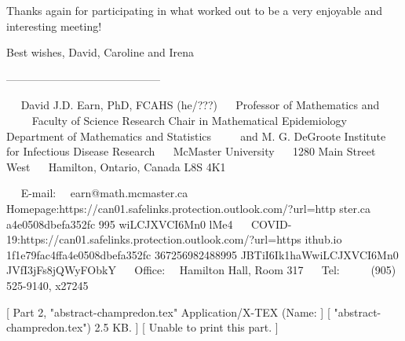 Thanks again for participating in what worked out to be a very enjoyable
and interesting meeting!

Best wishes,
David, Caroline and Irena

------------------------------------------

   David J.D. Earn, PhD, FCAHS (he/???)
   Professor of Mathematics and
     Faculty of Science Research Chair in Mathematical Epidemiology
   Department of Mathematics and Statistics
     and M. G. DeGroote Institute for Infectious Disease Research
   McMaster University
   1280 Main Street West
   Hamilton, Ontario, Canada L8S 4K1

   E-mail:   earn@math.mcmaster.ca
   Homepage:https://can01.safelinks.protection.outlook.com/?url=http%
ster.ca%
a4e0508dbefa352fc%
995%
wiLCJXVCI6Mn0%
lMe4%
   COVID-19:https://can01.safelinks.protection.outlook.com/?url=https%
ithub.io%
1f1e79fac4ffa4e0508dbefa352fc%
367256982488995%
JBTiI6Ik1haWwiLCJXVCI6Mn0%
JVfI3jFs8jQWyFObkY%
   Office:   Hamilton Hall, Room 317
   Tel:      (905) 525-9140, x27245





    [ Part 2, "abstract-champredon.tex"  Application/X-TEX (Name: ]
    [ "abstract-champredon.tex") 2.5 KB. ]
    [ Unable to print this part. ]
